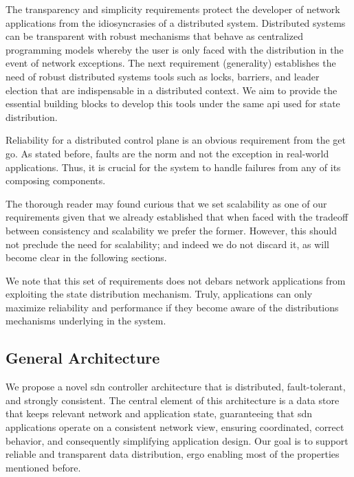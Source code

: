 The transparency and simplicity requirements protect the developer of network applications from the 
idiosyncrasies of a distributed system. 
Distributed systems can be transparent with robust mechanisms that behave
as centralized programming models whereby the user is only faced with the distribution 
in the event of network exceptions. 
The next requirement (generality) establishes the need of robust distributed systems tools such as locks,
barriers, and leader election that are indispensable in a distributed context.  
We aim to provide the essential building blocks to develop this tools under the same \gls{api} used for state distribution.

Reliability for a distributed control plane is an obvious requirement from the get go. 
As stated before, faults are the norm and not the exception in real-world applications.  
Thus, it is crucial for the system to handle failures from any of its composing components. 

The thorough reader may found curious that we set scalability as one of our requirements given that we already established that when faced with the tradeoff between consistency and scalability we prefer the former. 
However, this should not preclude the need for scalability; and indeed we do not discard it, as will become clear in the following sections. 

We note that this set of requirements does not debars network applications from exploiting the state distribution mechanism. 
Truly, applications can only maximize reliability and performance if they become aware of the distributions mechanisms underlying in the system. 


\subsection{General Architecture}
We propose a novel \gls{sdn} controller architecture that is distributed, fault-tolerant, and strongly consistent.
The central element of this architecture is a data store that keeps relevant network and application state, guaranteeing that \gls{sdn} applications operate on a consistent network view, ensuring coordinated, correct behavior, and consequently simplifying application design.
Our goal  is to support reliable and transparent  data distribution, ergo enabling  most of the properties mentioned before. 

